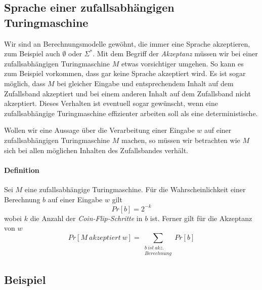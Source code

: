 \subsection{Sprache einer zufallsabhängigen Turingmaschine}
Wir sind an Berechnungsmodelle gewöhnt, die immer eine Sprache akzeptieren, zum Beispiel auch $\emptyset$ oder $\Sigma^*$.
Mit dem Begriff der \emph{Akzeptanz} müssen wir bei einer zufallsabhängigen Turingmaschine $M$ etwas vorsichtiger umgehen.
So kann es zum Beispiel vorkommen, dass gar keine Sprache akzeptiert wird.
Es ist sogar möglich, dass $M$ bei gleicher Eingabe und entsprechendem Inhalt auf dem Zufallsband akzeptiert und bei einem anderen Inhalt auf dem Zufallsband nicht akzeptiert.
Dieses Verhalten ist eventuell sogar gewünscht, wenn eine zufallsabhängige Turingmaschine effizienter arbeiten soll als eine deterministische.

Wollen wir eine Aussage über die Verarbeitung einer Eingabe $w$ auf einer zufallsabhängigen Turingmaschine $M$ machen, so müssen wir betrachten wie $M$ sich bei allen möglichen Inhalten des Zufallsbandes verhält.

\paragraph{Definition}
Sei $M$ eine zufallsabhängige Turingmaschine.
Für die Wahrscheinlichkeit einer Berechnung $b$ auf einer Eingabe $w$ gilt
\begin{equation*}
	Pr[b] = 2^{-k}
\end{equation*}
wobei $k$ die Anzahl der \emph{Coin-Flip-Schritte} in $b$ ist. 
Ferner gilt für die Akzeptanz von $w$
\begin{equation*}
	Pr[M\ akzeptiert\ w] = \sum_{\substack{b\ ist\ akz.\\ Berechnung}} Pr[b] 
\end{equation*}

\subsection{Beispiel}
\label{PTM_Example1}


